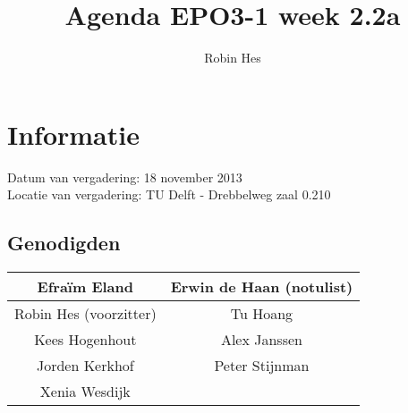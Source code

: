 \documentclass{article}
\begin{document}
\title{Agenda EPO3-1 week 2.2a}%
\author{Robin Hes}%
\maketitle

\section*{Informatie}
Datum van vergadering: 18 november 2013\\ %
Locatie van vergadering: TU Delft - Drebbelweg zaal 0.210 %
\subsection*{Genodigden}
\begin{center}
\begin{tabular}{|c |c |}
	\hline
	Efraïm Eland & Erwin de Haan (notulist)\\
	\hline
	Robin Hes (voorzitter) & Tu Hoang \\
	\hline
	Kees Hogenhout & Alex Janssen \\
	\hline
	Jorden Kerkhof & Peter Stijnman \\
	\hline
	Xenia Wesdijk & \\
	\hline
\end{tabular}
\end{center}
\end{document}
